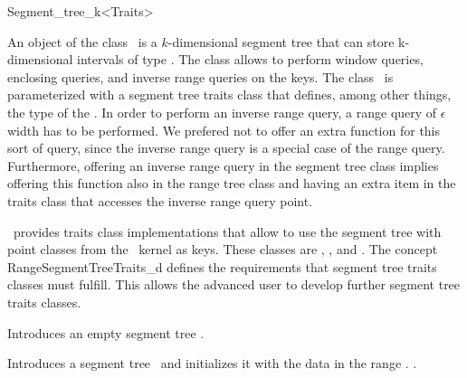\begin{ccRefClass}{Segment_tree_k<Traits>}

\ccDefinition


An object of the class  \ccClassName\ is a $k$-dimensional segment tree
that can store k-dimensional intervals  of type . 
The class allows to perform
window queries, enclosing queries, and inverse range queries on the keys.  The class \ccClassName\ is parameterized with
a segment tree traits class  that defines, among other things, 
the type of the . 
In order to perform an inverse range query, a range query of
$\epsilon$ width has to be performed. We prefered not to offer an
extra function for this sort of query, since the inverse range
query is a special case of the range query. Furthermore, offering
an inverse range query in the segment tree class implies offering this
function also in the range tree class and having an extra item in
the traits class that accesses the inverse range query point.


\cgal\ provides traits class implementations that allow to use 
the segment tree with point classes from the \cgal\ kernel as keys.
These classes are ,
, 
 and
.  The concept
RangeSegmentTreeTraits\_d defines the requirements that segment tree traits
classes must fulfill. This allows the advanced user to develop further
segment tree traits classes.



\ccTypes




\ccCreation

{Introduces an empty segment tree \ccVar.}

%
{Introduces a segment tree \ccVar\ and initializes it with the data
in the range \ccc{[first, last)}.
\ccPrecond {}.}

\ccOperations


\end{ccRefClass}
